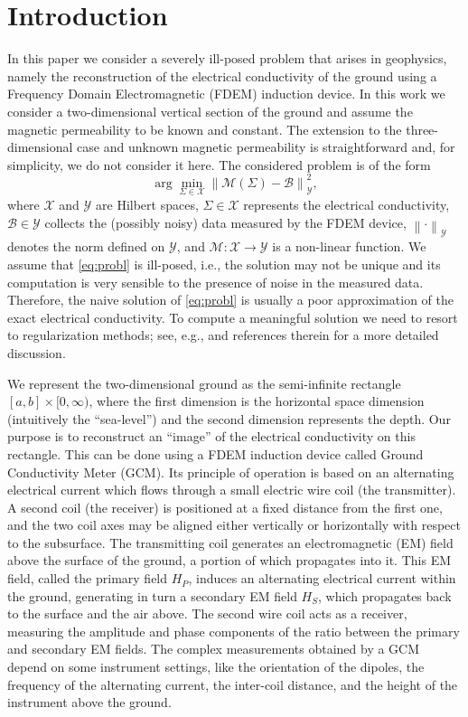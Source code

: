 \documentclass[final,leqno]{siamltex}
\newcommand{\norm}[1]{\left\| #1 \right\|}
\begin{document}
\section{Introduction}
In this paper we consider a severely ill-posed problem that arises in geophysics, namely the reconstruction of the electrical conductivity of the ground using a Frequency Domain Electromagnetic (FDEM) induction device. In this work we consider a two-dimensional vertical section of the ground and assume the magnetic permeability to be known and constant. The extension to the three-dimensional case and unknown magnetic permeability is straightforward and, for simplicity, we do not consider it here. The considered problem is of the form
\begin{equation}\label{eq:probl}
	\arg\min_{\Sigma\in\mathcal{X}}\norm{\mathcal{M}(\Sigma)-\mathcal{B}}_\mathcal{Y}^2,
\end{equation}
where $\mathcal{X}$ and $\mathcal{Y}$ are Hilbert spaces, $\Sigma\in\mathcal{X}$ represents the electrical conductivity, $\mathcal{B}\in\mathcal{Y}$ collects the (possibly noisy) data measured by the FDEM device, $\norm{\cdot}_\mathcal{Y}$ denotes the norm defined on $\mathcal{Y}$, and $\mathcal{M}:\mathcal{X}\rightarrow\mathcal{Y}$ is a non-linear function. We assume that \eqref{eq:probl} is ill-posed, i.e., the solution may not be unique and its computation is very sensible to the presence of noise in the measured data. Therefore, the naive solution of \eqref{eq:probl} is usually a poor approximation of the exact electrical conductivity. To compute a meaningful solution we need to resort to regularization methods; see, e.g., \cite{Engl} and references therein for a more detailed discussion. 

We represent the two-dimensional ground as the semi-infinite rectangle $[a,b]\times[0,\infty)$, where the first dimension is the horizontal space dimension (intuitively the ``sea-level'') and the second dimension represents the depth. Our purpose is to reconstruct an ``image'' of the electrical conductivity on this rectangle. This can be done using a FDEM induction device called Ground Conductivity Meter (GCM). Its principle of operation is based on an alternating electrical current which flows through a small electric wire coil (the transmitter). A second coil (the receiver) is positioned at a fixed distance from the first one, and the two coil axes may be aligned either vertically or horizontally with respect to the subsurface. The transmitting coil generates an electromagnetic (EM) field above the surface of the ground, a portion of which propagates into it.
This EM field, called the primary field $H_P$, induces an alternating electrical current within the ground, generating in turn a secondary EM field $H_S$, which propagates back to the surface and the air above. The second wire coil acts as a receiver, measuring the amplitude and phase components of the ratio between the primary and secondary EM fields. The complex measurements obtained by a GCM depend on some instrument settings, like the orientation of the dipoles, the frequency of the alternating current, the inter-coil distance, and the height of the instrument above the ground.
\end{document}
